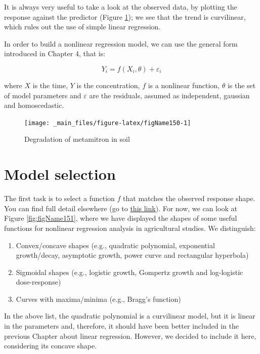 \documentclass[a4paper,12pt,oneside]{book}
\providecommand{\tightlist}{%
  \setlength{\itemsep}{0pt}\setlength{\parskip}{0pt}}
\begin{document}
It is always very useful to take a look at the observed data, by plotting the response against the predictor (Figure \ref{fig:figName150}); we see that the trend is curvilinear, which rules out the use of simple linear regression.

In order to build a nonlinear regression model, we can use the general form introduced in Chapter 4, that is:

\[Y_i = f(X_i, \theta) + \varepsilon_i\]

where \(X\) is the time, \(Y\) is the concentration, \(f\) is a nonlinear function, \(\theta\) is the set of model parameters and \(\varepsilon\) are the residuals, assumed as independent, gaussian and homoscedastic.

\begin{figure}

{\centering \texttt{[image: \_main\_files/figure-latex/figName150-1]} 

}

\caption{Degradation of metamitron in soil}\label{fig:figName150}
\end{figure}

\hypertarget{model-selection}{%
\section{Model selection}\label{model-selection}}

The first task is to select a function \(f\) that matches the observed response shape. You can find full detail elsewhere (go to \href{https://www.statforbiology.com/2020/stat_nls_usefulfunctions/}{this link}). For now, we can look at Figure \ref{fig:figName151}, where we have displayed the shapes of some useful functions for nonlinear regression analysis in agricultural studies. We distinguish:

\begin{enumerate}
\def\labelenumi{\arabic{enumi}.}
\tightlist
\item
  Convex/concave shapes (e.g., quadratic polynomial, exponential growth/decay, asymptotic growth, power curve and rectangular hyperbola)
\item
  Sigmoidal shapes (e.g., logistic growth, Gompertz growth and log-logistic dose-response)
\item
  Curves with maxima/minima (e.g., Bragg's function)
\end{enumerate}

In the above list, the quadratic polynomial is a curvilinear model, but it is linear in the parameters and, therefore, it should have been better included in the previous Chapter about linear regression. However, we decided to include it here, considering its concave shape.
\end{document}
